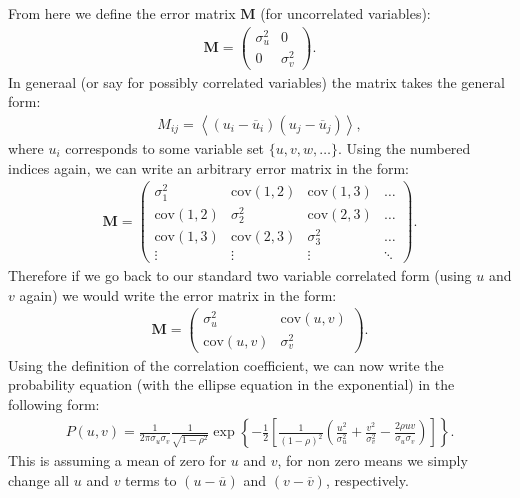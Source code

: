 \documentclass{article}
\newcommand{\cov}[2]{
  \mathrm{cov}(#1,#2)
}
\newcommand{\vecb}[1]{\boldsymbol{\mathbf{#1}}}
\begin{document}
From here we define the error matrix $\vecb{M}$ (for uncorrelated variables):
\begin{align}
  \vecb{M} = \begin{pmatrix}
    \sigma_u^2   & 0                                \\
    0            & \sigma_v^2
  \end{pmatrix}.
  \label{eq:error_matrix}
\end{align}
In generaal (or say for possibly  correlated variables) the matrix takes the general form:
\begin{align}
  M_{ij} = \left\langle\left(u_i - \overline{u}_i\right)\left(u_j-\overline{u}_j\right)\right\rangle,
  \label{eq:error_matrix_elements}
\end{align}
where $u_i$ corresponds to some variable set $\{u,v,w,\dotsc\}$. Using the numbered indices again, we can write an arbitrary error matrix in the form:
\begin{align}
  \vecb{M} = \begin{pmatrix}
    \sigma_1^2   & \cov{1}{2} & \cov{1}{3} & \ldots \\
    \cov{1}{2}   & \sigma_2^2 & \cov{2}{3} & \ldots \\
    \cov{1}{3}   & \cov{2}{3} & \sigma_3^2 & \ldots \\
    \vdots       & \vdots     & \vdots     & \ddots
  \end{pmatrix}.
\end{align}
Therefore if we go back to our standard two variable correlated form (using $u$ and $v$ again) we would write the error matrix in the form:
\begin{align}
  \vecb{M} = \begin{pmatrix}
    \sigma_u^2   & \cov{u}{v}                       \\
    \cov{u}{v}   & \sigma_v^2
  \end{pmatrix}.
\end{align}
Using the definition of the correlation coefficient, we can now write the probability equation (with the ellipse equation in the exponential) in the following form:
\begin{align}
  P(u,v) = \frac{1}{2\pi\sigma_u\sigma_v}\frac{1}{\sqrt{1-\rho^2}}\exp\left\{-\frac{1}{2}\left[\frac{1}{(1-\rho)^2}\left(\frac{u^2}{\sigma_u^2}+\frac{v^2}{\sigma_v^2}-\frac{2\rho u v}{\sigma_u\sigma_v}\right)\right]\right\}.
\end{align}
This is assuming a mean of zero for $u$ and $v$, for non zero means we simply change all $u$ and $v$ terms to $(u-\overline{u})$ and $(v-\overline{v})$, respectively.
\end{document}
